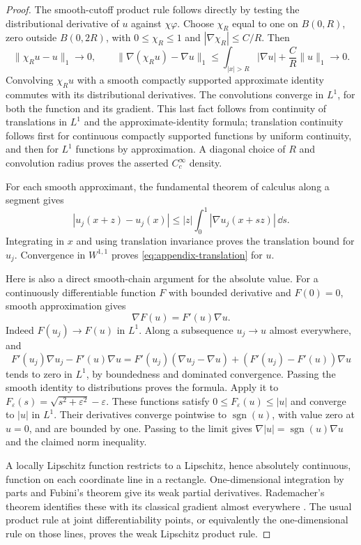 \begin{proof}
The smooth-cutoff product rule follows directly by testing the
distributional derivative of $u$ against $\chi\varphi$.
Choose $\chi_R$ equal to one on $B(0,R)$, zero outside
$B(0,2R)$, with $0\le\chi_R\le1$ and
$|\nabla\chi_R|\le C/R$. Then
\[
 \|\chi_Ru-u\|_1\longrightarrow0,
 \qquad
 \|\nabla(\chi_Ru)-\nabla u\|_1
 \le\int_{|x|>R}|\nabla u|+\frac C R\|u\|_1
 \longrightarrow0.
\]
Convolving $\chi_Ru$ with a smooth compactly supported approximate
identity commutes with its distributional derivatives. The
convolutions converge in $L^1$, for both the function and its
gradient. This last fact follows from continuity of translations
in $L^1$ and the approximate-identity formula; translation
continuity follows first for continuous compactly supported
functions by uniform continuity, and then for $L^1$ functions
by approximation. A diagonal choice of $R$ and convolution
radius proves the asserted $C_c^\infty$ density.

For each smooth approximant, the fundamental theorem of calculus
along a segment gives
\[
 |u_j(x+z)-u_j(x)|
 \le |z|\int_0^1|\nabla u_j(x+sz)|\,\dd s.
\]
Integrating in $x$ and using translation invariance proves the
translation bound for $u_j$. Convergence in $W^{1,1}$ proves
\eqref{eq:appendix-translation} for $u$.

Here is also a direct smooth-chain argument for the absolute
value. For a continuously differentiable function $F$ with bounded
derivative and $F(0)=0$, smooth approximation gives
\[
 \nabla F(u)=F'(u)\nabla u.
\]
Indeed $F(u_j)\to F(u)$ in $L^1$. Along a subsequence $u_j\to u$
almost everywhere, and
\[
 F'(u_j)\nabla u_j-F'(u)\nabla u
 =F'(u_j)(\nabla u_j-\nabla u)
       +(F'(u_j)-F'(u))\nabla u
\]
tends to zero in $L^1$, by boundedness and dominated convergence.
Passing the smooth identity to distributions proves the formula.
Apply it to
$F_\varepsilon(s)=\sqrt{s^2+\varepsilon^2}-\varepsilon$.
These functions satisfy $0\le F_\varepsilon(u)\le|u|$ and
converge to $|u|$ in $L^1$. Their derivatives converge pointwise
to $\operatorname{sgn}(u)$, with value zero at $u=0$, and are
bounded by one. Passing to the limit gives
$\nabla|u|=\operatorname{sgn}(u)\nabla u$ and the claimed norm
inequality.

A locally Lipschitz function restricts to a Lipschitz, hence
absolutely continuous, function on each coordinate line in a
rectangle. One-dimensional integration by parts and Fubini's
theorem give its weak partial derivatives. Rademacher's theorem
identifies these with its classical gradient almost everywhere
\cite[Chapter~3, Theorems~3.38--3.39]{Hunter2014}. The usual
product rule at joint differentiability points, or equivalently
the one-dimensional rule on those lines, proves the weak
Lipschitz product rule.


\end{proof}

